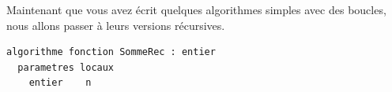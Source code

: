 \documentclass[11pt,a4paper]{article}
\begin{document}
Maintenant que vous avez écrit quelques algorithmes simples avec des boucles, nous allons passer à leurs versions récursives.

\bigskip


\bigskip

\begin{table}[h!]
  \centering
  \begin{minipage}{0.5\textwidth}
    \centering
\begin{lstlisting}[style=algorithmique]
algorithme fonction SommeRec : entier
  parametres locaux
    entier    n


\end{lstlisting}
\end{minipage}
\end{table}
\end{document}
